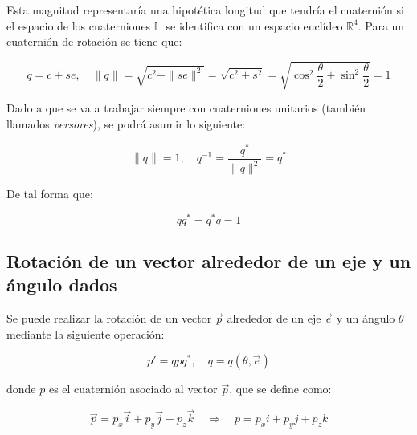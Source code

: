 \documentclass[12pt, a4paper]{report}
\begin{document}
Esta magnitud representaría una hipotética longitud que tendría el cuaternión si el espacio de los cuaterniones $\mathbb{H}$ se identifica con un espacio euclídeo $\mathbb{R}^4$. Para un cuaternión de rotación se tiene que:

$$ q = c + se, \quad \|q\| = \sqrt{c^2 + \|se\|^2} = \sqrt{c^2 + s^2} = \sqrt{\cos^2{\displaystyle\frac{\theta}{2}} + \sin^2{\displaystyle\frac{\theta}{2}}} = 1 $$

Dado a que se va a trabajar siempre con cuaterniones unitarios (también llamados \textit{versores}), se podrá asumir lo siguiente:

\begin{equation}
\|q\| = 1 , \quad q^{-1} = \frac{q^*}{\|q\|^2} = q^*
\end{equation}

De tal forma que:

\begin{equation} \label{eq: qq*}
qq^* = q^*q = 1
\end{equation}

\subsection{Rotación de un vector alrededor de un eje y un ángulo dados}

Se puede realizar la rotación de un vector $\vec{p}$ alrededor de un eje $\vec{e}$ y un ángulo $\theta$ mediante la siguiente operación:

\begin{equation} \label{eq: E14}
p' = qpq^*, \quad q = q(\theta, \vec{e})
\end{equation}

donde $p$ es el cuaternión asociado al vector $\vec{p}$, que se define como:

\begin{equation} \label{eq: E15}
\vec{p} = p_x\vec{i} + p_y\vec{j} + p_z\vec{k} \quad \Rightarrow \quad p = p_xi + p_yj + p_zk
\end{equation}
\end{document}
